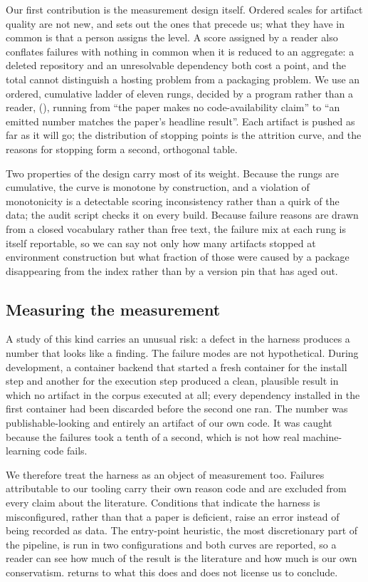 Our first contribution is the measurement design itself. Ordered scales for
artifact quality are not new, and  sets out the ones that
precede us; what they have in common is that a person assigns the level. A score
assigned by a reader also conflates failures with nothing in common when it is
reduced to an aggregate: a deleted repository and an unresolvable dependency both
cost a point, and the total cannot distinguish a hosting problem from a packaging
problem. We use an ordered, cumulative ladder of eleven rungs, decided by a
program rather than a reader,
(), running from ``the paper makes no code-availability
claim'' to ``an emitted number matches the paper's headline result''. Each
artifact is pushed as far as it will go; the distribution of stopping points is
the attrition curve, and the reasons for stopping form a second, orthogonal
table.

Two properties of the design carry most of its weight. Because the rungs are
cumulative, the curve is monotone by construction, and a violation of
monotonicity is a detectable scoring inconsistency rather than a quirk of the
data; the audit script checks it on every build. Because failure reasons are
drawn from a closed vocabulary rather than free text, the failure mix at each
rung is itself reportable, so we can say not only how many artifacts stopped at
environment construction but what fraction of those were caused by a package
disappearing from the index rather than by a version pin that has aged out.

\subsection{Measuring the measurement}\label{sec:intro_reflexive}

A study of this kind carries an unusual risk: a defect in the harness produces a
number that looks like a finding. The failure modes are not hypothetical. During
development, a container backend that started a fresh container for the install
step and another for the execution step produced a clean, plausible result in
which no artifact in the corpus executed at all; every dependency installed in
the first container had been discarded before the second one ran. The number was
publishable-looking and entirely an artifact of our own code. It was caught
because the failures took a tenth of a second, which is not how real
machine-learning code fails.

We therefore treat the harness as an object of measurement too. Failures
attributable to our tooling carry their own reason code and are excluded from
every claim about the literature. Conditions that indicate the harness is
misconfigured, rather than that a paper is deficient, raise an error instead of
being recorded as data. The entry-point heuristic, the most discretionary part of
the pipeline, is run in two configurations and both curves are reported, so a
reader can see how much of the result is the literature and how much is our own
conservatism.  returns to what this does and does not
license us to conclude.

